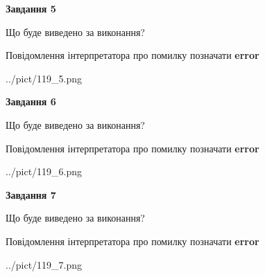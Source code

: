 \documentclass[10pt, ukrainian]{article}
\begin{document}
{\begin {large}
{\begin {center}\textbf{Завдання 5}\end {center}}\par
Що буде виведено за виконання? \par
Повідомлення інтерпретатора про помилку позначати \textbf{error}

\begin{center}
	{../pict/119_5.png}
\end{center}
\newpage

{\begin {center}\textbf{Завдання 6}\end {center}}\par
Що буде виведено за виконання? \par
Повідомлення інтерпретатора про помилку позначати \textbf{error}

\begin{center}
	{../pict/119_6.png}
\end{center}
\newpage

{\begin {center}\textbf{Завдання 7}\end {center}}\par
Що буде виведено за виконання? \par
Повідомлення інтерпретатора про помилку позначати \textbf{error}

\begin{center}
	{../pict/119_7.png}
\end{center}
\newpage

\end {large}}
\end{document}
